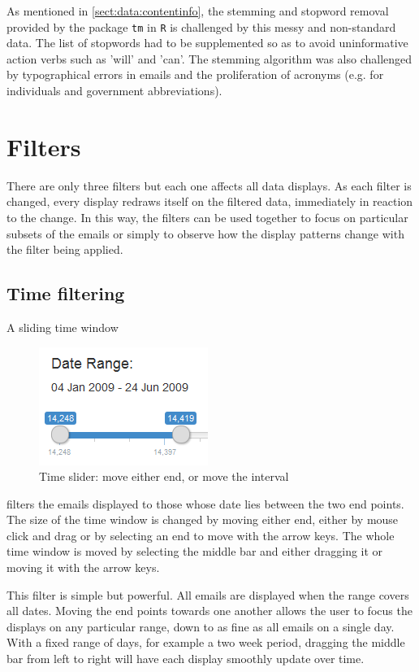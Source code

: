 \documentclass[journal]{vgtc}                %
\begin{document}
As mentioned in \autoref{sect:data:contentinfo}, the stemming and stopword removal provided by the package \texttt{tm} in \texttt{R} is challenged by this messy and non-standard data. The list of stopwords had to be supplemented so as to avoid uninformative action verbs such as 'will' and 'can'. The stemming algorithm was also challenged by typographical errors in emails and the proliferation of acronyms (e.g. for individuals and government abbreviations).   

\section{Filters}
\label{sect:Filters}
There are only three filters but each one affects all data displays.  As each filter is changed, every display redraws itself on the filtered data, immediately in reaction to the change.  In this way, the filters can be used together to focus on particular subsets of the emails or simply to observe how the display patterns change with the filter being applied.
\subsection{Time filtering}
A sliding time window 
\begin{figure}[h]
\begin{center}
\includegraphics[width=0.35\linewidth]{DateSliderImage}
\caption{Time slider: move either end, or move the interval}
\end{center}
\label{fig:timeSlider}
\end{figure}
filters the emails displayed to those whose date lies between the two end points.
The size of the time window is changed by  moving either end, either by mouse click and drag or by selecting an end to move with the arrow keys. The whole time window is moved by selecting the middle bar and either dragging it or moving it with the arrow keys.

This filter is simple but powerful.  All emails are displayed when the range covers all dates.  Moving the end points towards one another allows the user to focus the displays on any particular range, down to as fine as all emails on a single day.  With a fixed range of days, for example a two week period,  dragging the middle bar from left to right will have each display smoothly update over time.
%
\end{document}
